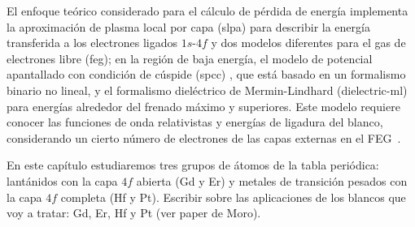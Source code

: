 El enfoque teórico considerado para el cálculo de pérdida de energía 
implementa la aproximación de plasma local por capa (\acs{slpa}) 
\cite{Montanari:13} para describir la energía transferida a los 
electrones ligados $1s$-$4f$ y dos modelos diferentes para el gas de 
electrones libre (\acs{feg}); en la región de baja energía, el modelo 
de potencial apantallado con condición de cúspide (\acs{spcc}) 
\cite{Montanari:17}, que está basado en un formalismo binario no lineal, 
y el formalismo dieléctrico de Mermin-Lindhard (\acs{dielectric-ml}) 
\cite{Mermin:70} para energías alrededor del frenado máximo y 
superiores. Este modelo requiere conocer las funciones de onda 
relativistas y energías de ligadura del blanco, considerando un cierto 
número de electrones de las capas externas en el FEG~\cite{Mendez:19}. 

En este capítulo estudiaremos tres grupos de átomos de la tabla 
periódica: lantánidos con la capa $4f$ abierta (Gd y Er) y metales de 
transición pesados con la capa $4f$ completa (Hf y Pt). 
{\color{red} Escribir sobre las aplicaciones de los blancos que voy a 
tratar: Gd, Er, Hf y Pt  (ver paper de Moro).}


